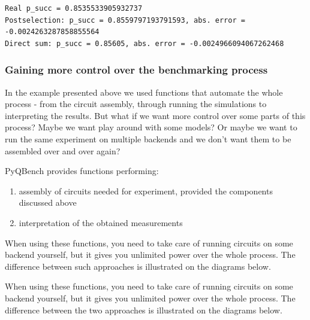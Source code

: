\documentclass[preprint,12pt, a4paper, dvipsnames]{elsarticle}
\newcommand{\1}{{\rm 1\hspace{-0.9mm}l}}
\begin{document}
\begin{lstlisting}
Real p_succ = 0.8535533905932737
Postselection: p_succ = 0.8559797193791593, abs. error = -0.0024263287858855564
Direct sum: p_succ = 0.85605, abs. error = -0.0024966094067262468
\end{lstlisting}


\subsubsection{Gaining more control over the benchmarking process}
In the example presented above we used functions that automate the whole process - from the circuit assembly, through running the simulations to interpreting the results. But what if we want more control over some parts of this process? Maybe we want play around with some models? Or maybe we want to run the same experiment on multiple backends and we don’t want them to be assembled over and over again?

 PyQBench provides functions performing:
\begin{enumerate}
\item assembly of circuits needed for experiment, provided the components discussed above
\item interpretation of the obtained measurements
\end{enumerate}
When using these functions, you need to take care of running circuits on some backend yourself, but it gives you unlimited power over the whole process. The difference between such approaches is illustrated on the diagrams below.

When using these functions, you need to take care of running circuits on some backend yourself, but it gives you unlimited power over the whole process. The difference between the two approaches is illustrated on the diagrams below.
\end{document}
